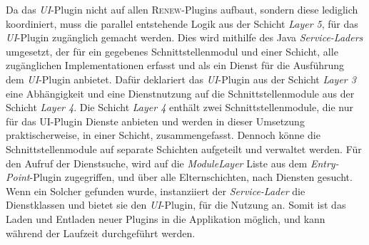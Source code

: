 	Da das \textit{UI}-Plugin nicht auf allen \textsc{Renew}-Plugins aufbaut, sondern diese lediglich koordiniert, muss die parallel entstehende Logik aus der Schicht \textit{Layer 5}, für das \textit{UI}-Plugin zugänglich gemacht werden. Dies wird mithilfe des Java \textit{Service-Laders} umgesetzt, der für ein gegebenes Schnittstellenmodul und einer Schicht, alle zugänglichen Implementationen erfasst und als ein Dienst für die Ausführung dem \textit{UI}-Plugin anbietet. Dafür deklariert das \textit{UI}-Plugin aus der Schicht \textit{Layer 3} eine Abhängigkeit und eine Dienstnutzung auf die Schnittstellenmodule aus der Schicht \textit{Layer 4}. Die Schicht \textit{Layer 4} enthält zwei Schnittstellenmodule, die nur für das UI-Plugin Dienste anbieten und werden in dieser Umsetzung praktischerweise, in einer Schicht, zusammengefasst. Dennoch könne die Schnittstellenmodule auf separate Schichten aufgeteilt und verwaltet werden. \newline 
	Für den Aufruf der Dienstsuche, wird auf die \textit{ModuleLayer} Liste aus dem \textit{Entry-Point}-Plugin zugegriffen, und über alle Elternschichten, nach Diensten gesucht. Wenn ein Solcher gefunden wurde, instanziiert der \textit{Service-Lader} die Dienstklassen und bietet sie den \textit{UI}-Plugin, für die Nutzung an. Somit ist das Laden und Entladen neuer Plugins in die Applikation möglich, und kann während der Laufzeit durchgeführt werden.  


